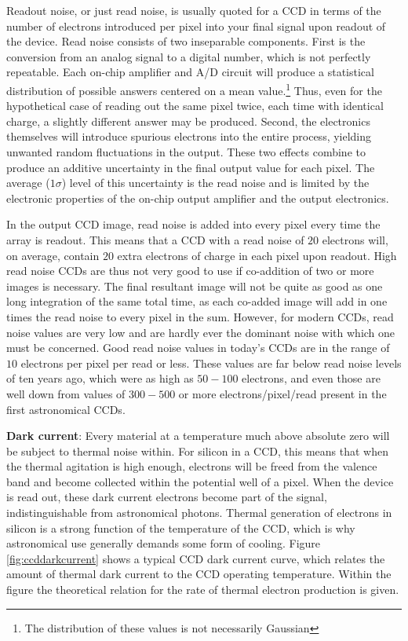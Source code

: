 \documentclass[a4paper,10pt]{article}
\begin{document}
{\noindent}Readout noise, or just read noise, is usually quoted for a CCD in terms of the number of electrons introduced per pixel into your final signal upon readout of the device. Read noise consists of two inseparable components. First is the conversion from an analog signal to a digital number, which is not perfectly repeatable. Each on-chip amplifier and A/D circuit will produce a statistical distribution of possible answers centered on a mean value.\footnote{The distribution of these values is not necessarily Gaussian} Thus, even for the hypothetical case of reading out the same pixel twice, each time with identical charge, a slightly different answer may be produced. Second, the electronics themselves will introduce spurious electrons into the entire process, yielding unwanted random fluctuations in the output. These two effects combine to produce an additive uncertainty in the final output value for each pixel. The average ($1\sigma$) level of this uncertainty is the read noise and is limited by the electronic properties of the on-chip output amplifier and the output electronics.

{\noindent}In the output CCD image, read noise is added into every pixel every time the array is readout. This means that a CCD with a read noise of $20$ electrons will, on average, contain $20$ extra electrons of charge in each pixel upon readout. High read noise CCDs are thus not very good to use if co-addition of two or more images is necessary. The final resultant image will not be quite as good as one long integration of the same total time, as each co-added image will add in one times the read noise to every pixel in the sum. However, for modern CCDs, read noise values are very low and are hardly ever the dominant noise with which one must be concerned. Good read noise values in today's CCDs are in the range of $10$ electrons per pixel per read or less. These values are far below read noise levels of ten years ago, which were as high as $50-100$ electrons, and even those are well down from values of $300-500$ or more electrons/pixel/read present in the first astronomical CCDs.

{\noindent}\textbf{Dark current}: Every material at a temperature much above absolute zero will be subject to thermal noise within. For silicon in a CCD, this means that when the thermal agitation is high enough, electrons will be freed from the valence band and become collected within the potential well of a pixel. When the device is read out, these dark current electrons become part of the signal, indistinguishable from astronomical photons. Thermal generation of electrons in silicon is a strong function of the temperature of the CCD, which is why astronomical use generally demands some form of cooling. Figure \ref{fig:ccddarkcurrent} shows a typical CCD dark current curve, which relates the amount of thermal dark current to the CCD operating temperature. Within the figure the theoretical relation for the rate of thermal electron production is given.
\end{document}
